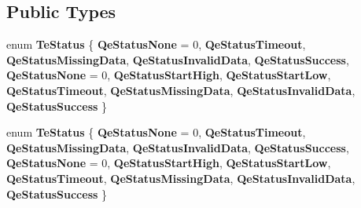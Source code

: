 \subsection*{Public Types}
\begin{DoxyCompactItemize}
\item 
\mbox{\label{class_g_n_common_1_1_g_n_drivers_1_1_g_tc_d_h_t_sensor_a7bf14575ba24e0bc8b085c3249b68930}} 
enum {\bfseries Te\+Status} \{ \newline
{\bfseries Qe\+Status\+None} = 0, 
{\bfseries Qe\+Status\+Timeout}, 
{\bfseries Qe\+Status\+Missing\+Data}, 
{\bfseries Qe\+Status\+Invalid\+Data}, 
\newline
{\bfseries Qe\+Status\+Success}, 
{\bfseries Qe\+Status\+None} = 0, 
{\bfseries Qe\+Status\+Start\+High}, 
{\bfseries Qe\+Status\+Start\+Low}, 
\newline
{\bfseries Qe\+Status\+Timeout}, 
{\bfseries Qe\+Status\+Missing\+Data}, 
{\bfseries Qe\+Status\+Invalid\+Data}, 
{\bfseries Qe\+Status\+Success}
 \}
\item 
\mbox{\label{class_g_n_common_1_1_g_n_drivers_1_1_g_tc_d_h_t_sensor_a7bf14575ba24e0bc8b085c3249b68930}} 
enum {\bfseries Te\+Status} \{ \newline
{\bfseries Qe\+Status\+None} = 0, 
{\bfseries Qe\+Status\+Timeout}, 
{\bfseries Qe\+Status\+Missing\+Data}, 
{\bfseries Qe\+Status\+Invalid\+Data}, 
\newline
{\bfseries Qe\+Status\+Success}, 
{\bfseries Qe\+Status\+None} = 0, 
{\bfseries Qe\+Status\+Start\+High}, 
{\bfseries Qe\+Status\+Start\+Low}, 
\newline
{\bfseries Qe\+Status\+Timeout}, 
{\bfseries Qe\+Status\+Missing\+Data}, 
{\bfseries Qe\+Status\+Invalid\+Data}, 
{\bfseries Qe\+Status\+Success}
 \}
\end{DoxyCompactItemize}
